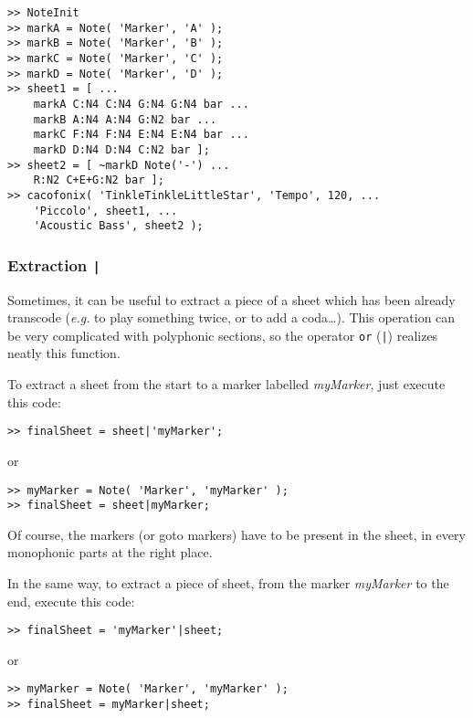 \documentclass{article}
\newcommand\eg{\emph{e.g.}\xspace}
\begin{document}
\begin{lstlisting}
>> NoteInit
>> markA = Note( 'Marker', 'A' );
>> markB = Note( 'Marker', 'B' );
>> markC = Note( 'Marker', 'C' );
>> markD = Note( 'Marker', 'D' );
>> sheet1 = [ ...
	markA C:N4 C:N4 G:N4 G:N4 bar ...
	markB A:N4 A:N4 G:N2 bar ...
	markC F:N4 F:N4 E:N4 E:N4 bar ...
	markD D:N4 D:N4 C:N2 bar ];
>> sheet2 = [ ~markD Note('-') ...
	R:N2 C+E+G:N2 bar ];
>> cacofonix( 'TinkleTinkleLittleStar', 'Tempo', 120, ...
	'Piccolo', sheet1, ...
	'Acoustic Bass', sheet2 );
\end{lstlisting}

\subsubsection{Extraction \lstinline!|!}
\label{sec:Extraction}

Sometimes, it can be useful to extract a piece of a sheet which has been already transcode (\eg to play something twice, or to add a coda\dots). This operation can be very complicated with polyphonic sections, so the operator \lstinline!or! (\lstinline!|!) realizes neatly this function.

To extract a sheet from the start to a marker labelled \emph{myMarker}, just execute this code:
\begin{lstlisting}
>> finalSheet = sheet|'myMarker';
\end{lstlisting}
or
\begin{lstlisting}
>> myMarker = Note( 'Marker', 'myMarker' );
>> finalSheet = sheet|myMarker;
\end{lstlisting}
Of course, the markers (or goto markers) have to be present in the sheet, in every monophonic parts at the right place.

In the same way, to extract a piece of sheet, from the marker \emph{myMarker} to the end, execute this code:
\begin{lstlisting}
>> finalSheet = 'myMarker'|sheet;
\end{lstlisting}
or
\begin{lstlisting}
>> myMarker = Note( 'Marker', 'myMarker' );
>> finalSheet = myMarker|sheet;
\end{lstlisting}
\end{document}
